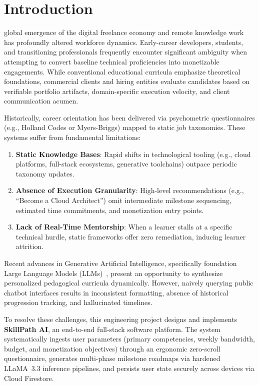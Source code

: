 \documentclass[conference]{IEEEtran}
\begin{document}
\section{Introduction}
 global emergence of the digital freelance economy and remote knowledge work has profoundly altered workforce dynamics. Early-career developers, students, and transitioning professionals frequently encounter significant ambiguity when attempting to convert baseline technical proficiencies into monetizable engagements. While conventional educational curricula emphasize theoretical foundations, commercial clients and hiring entities evaluate candidates based on verifiable portfolio artifacts, domain-specific execution velocity, and client communication acumen.

Historically, career orientation has been delivered via psychometric questionnaires (e.g., Holland Codes or Myers-Briggs) mapped to static job taxonomies. These systems suffer from fundamental limitations:
\begin{enumerate}
    \item \textbf{Static Knowledge Bases}: Rapid shifts in technological tooling (e.g., cloud platforms, full-stack ecosystems, generative toolchains) outpace periodic taxonomy updates.
    \item \textbf{Absence of Execution Granularity}: High-level recommendations (e.g., ``Become a Cloud Architect'') omit intermediate milestone sequencing, estimated time commitments, and monetization entry points.
    \item \textbf{Lack of Real-Time Mentorship}: When a learner stalls at a specific technical hurdle, static frameworks offer zero remediation, inducing learner attrition.
\end{enumerate}

Recent advances in Generative Artificial Intelligence, specifically foundation Large Language Models (LLMs)~\cite{vaswani2017attention, touvron2023llama, dubey2024llama3}, present an opportunity to synthesize personalized pedagogical curricula dynamically. However, naively querying public chatbot interfaces results in inconsistent formatting, absence of historical progression tracking, and hallucinated timelines.

To resolve these challenges, this engineering project designs and implements \textbf{SkillPath AI}, an end-to-end full-stack software platform. The system systematically ingests user parameters (primary competencies, weekly bandwidth, budget, and monetization objectives) through an ergonomic zero-scroll questionnaire, generates multi-phase milestone roadmaps via hardened LLaMA~3.3 inference pipelines, and persists user state securely across devices via Cloud Firestore.
\end{document}
